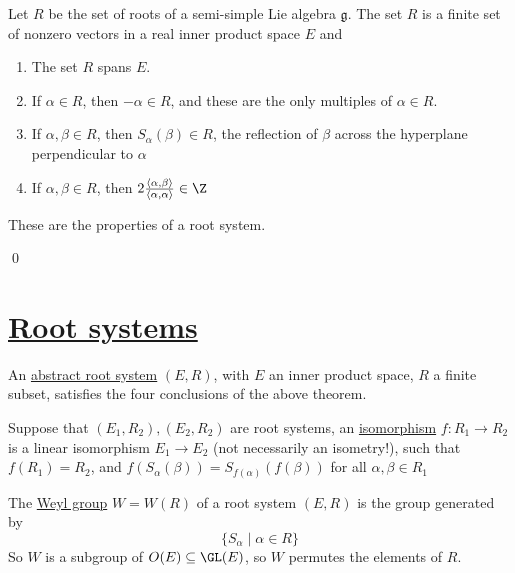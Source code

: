 \documentclass[x11names,reqno,14pt]{extarticle}
\newcommand{\mk}[1]{\mathfrak{#1}}
\newcommand{\g}{\mk{g}}
\begin{document}
\thm

Let $R$ be the set of roots of a semi-simple Lie algebra $\g$. The set $R$ is a finite set of nonzero vectors in a real inner product space $E$ and 
\begin{enumerate}[label=(\alph*)]

\item The set $R$ spans $E$. 

\item If $\alpha\in R$, then $-\alpha\in R$, and these are the only multiples of $\alpha\in R$. 

\item If $\alpha,\beta\in R$, then $S_\alpha(\beta)\in R$, the reflection of $\beta$ across the hyperplane perpendicular to $\alpha$

\item If $\alpha,\beta\in R$, then $2\frac{\langle\alpha,\beta\rangle}{\langle\alpha,\alpha\rangle} \in \Z$

\end{enumerate}

These are the properties of a root system. 

\proof

\qed

\section*{\underline{Root systems}}


An \underline{abstract root system} $(E,R)$, with $E$ an inner product space, $R$ a finite subset, satisfies the four conclusions of the above theorem.


Suppose that $(E_1,R_2),(E_2,R_2)$ are root systems, an \underline{isomorphism} $f:R_1\to R_2$ is a linear isomorphism $E_1\to E_2$ (not necessarily an isometry!), such that $f(R_1) = R_2$, and $f(S_\alpha(\beta)) = S_{f(\alpha)}(f(\beta))$ for all $\alpha,\beta\in R_1$


The \underline{Weyl group} $W = W(R)$ of a root system $(E,R)$ is the group generated by 
\[
\{S_\alpha\mid\alpha\in R\}
\]
So $W$ is a subgroup of $O(E) \subseteq \GL(E)$, so $W$ permutes the elements of $R$. 

\prop
\end{document}

